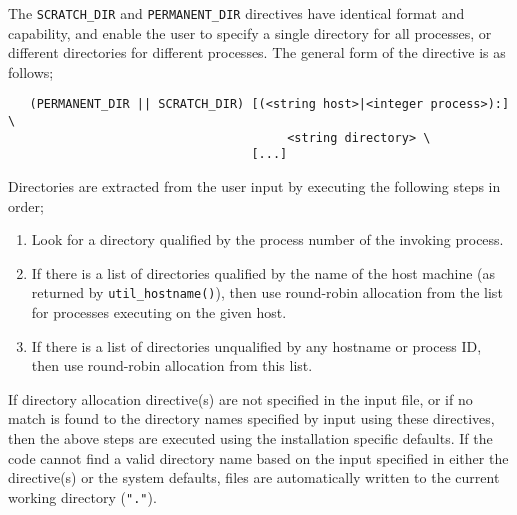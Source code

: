 The \verb+SCRATCH_DIR+ and \verb+PERMANENT_DIR+ directives have
identical format and capability, and enable the user to specify a
single directory for all processes, or different directories for
different processes.  The general form of the directive is as follows;

\begin{verbatim}
   (PERMANENT_DIR || SCRATCH_DIR) [(<string host>|<integer process>):] \
                                       <string directory> \ 
                                  [...]
\end{verbatim}

Directories are extracted from the user input by executing the
following steps in order;
\begin{enumerate}
\item Look for a directory qualified by the process number of the
  invoking process.
\item If there is a list of directories qualified by the name of the
  host machine (as returned by \verb+util_hostname()+), then use
  round-robin allocation from the list for processes executing on the
  given host. 
\item If there is a list of directories unqualified by any hostname
  or process ID, then use round-robin allocation from this list.
\end{enumerate}
If directory allocation directive(s) are not specified in the input
file, or if no match is found to the directory names specified by
input using these directives, then the above steps are executed using
the installation specific defaults.  If the code cannot find a valid
directory name based on the input specified in either the directive(s)
or the system defaults, files are automatically written to the current
working directory (\verb+"."+).

